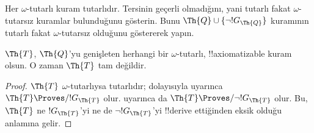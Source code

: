 \begin{prob}
  Her $\omega$-tutarlı kuram tutarlıdır. Tersinin geçerli olmadığını, yani
  tutarlı fakat $\omega$-tutarsız kuramlar bulunduğunu gösterin. Bunu
  $\Th{Q} \cup \{\lnot !G_\Th{Q}\}$ kuramının tutarlı fakat
  $\omega$-tutarsız olduğunu göstererek yapın.
\end{prob}

\begin{thm}
 $\Th{T}$, $\Th{Q}$'yu genişleten herhangi
bir $\omega$-tutarlı, !!{axiomatizable} kuram olsun. O zaman $\Th{T}$ tam
değildir.
\end{thm}

\begin{proof}
  $\Th{T}$ $\omega$-tutarlıysa tutarlıdır; dolayısıyla
   uyarınca $\Th{T} \Proves/ !G_\Th{T}$ olur.
   uyarınca da
  $\Th{T} \Proves/ \lnot !G_\Th{T}$ olur. Bu, $\Th{T}$ ne $!G_\Th{T}$'yi
  ne de $\lnot !G_\Th{T}$'yi !!{derive} ettiğinden eksik olduğu anlamına
  gelir.
\end{proof}

